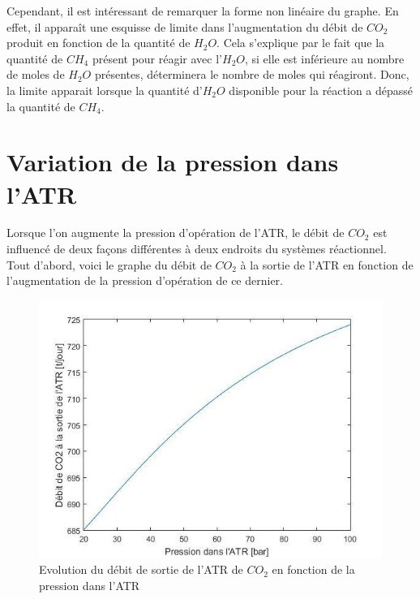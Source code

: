 \documentclass[12pt]{report}
\begin{document}
Cependant, il est intéressant de remarquer la forme non linéaire du graphe. En effet, il apparaît une esquisse de limite dans l'augmentation du débit de $CO_2$ produit en fonction de la quantité de $H_2O$. Cela s'explique par le fait que la quantité de $CH_4$ présent pour réagir avec l'$H_2O$, si elle est inférieure au nombre de moles de $H_2O$ présentes, déterminera le nombre de moles qui réagiront. Donc, la limite apparait lorsque la quantité d'$H_2O$ disponible pour la réaction a dépassé la quantité de $CH_4$.\\




\section{Variation de la pression dans l'ATR}

Lorsque l'on augmente la pression d'opération de l'ATR, le débit de $CO_2$ est influencé de deux façons différentes à deux endroits du systèmes réactionnel.\\

Tout d'abord, voici le graphe du débit de $CO_2$ à la sortie de l'ATR en fonction de l'augmentation de la pression d'opération de ce dernier.

\begin{figure}[H]
\begin{center}
\includegraphics[scale=0.6]{debit_CO2_ATR_pression_ATR}
\caption{Evolution du débit de sortie de l'ATR de $CO_2$ en fonction de la pression dans l'ATR}
\end{center}
\end{figure}
\end{document}
